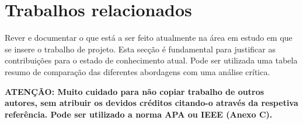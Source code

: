\section{Trabalhos relacionados} %
\label{sec:trabalhos_relacionados}

Rever e documentar o que está a ser feito atualmente na área em estudo em que se insere o trabalho de projeto. Esta secção é fundamental para justificar as contribuições para o estado de conhecimento atual. Pode ser utilizada uma tabela resumo de comparação das diferentes abordagens com uma análise crítica.

\vspace{2cm}

\textbf{ATENÇÃO: Muito cuidado para não copiar trabalho de outros autores, sem atribuir os devidos créditos citando-o através da respetiva referência. Pode ser utilizado a norma APA ou IEEE (Anexo C).}

